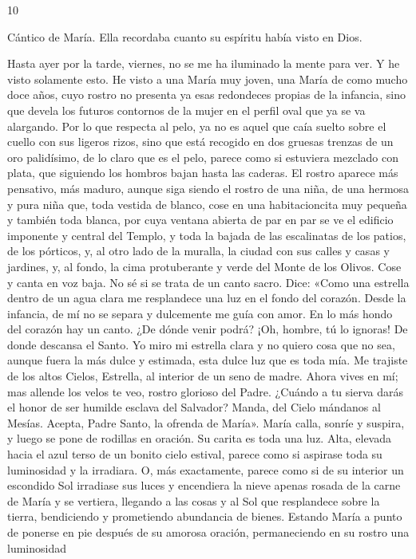\documentclass[12pt]{book} %
\begin{document}
10 
 
Cántico de María. Ella recordaba cuanto su espíritu había visto en Dios. 
 
Hasta ayer por la tarde, viernes, no se me ha iluminado la mente para ver. Y he visto solamente esto. He visto a una María muy joven, una María de como mucho doce años, cuyo rostro no presenta ya esas redondeces propias de la infancia, sino que devela los futuros contornos de la mujer en el perfil oval que ya se va alargando. Por lo  que respecta al pelo, ya no es aquel que caía suelto sobre el cuello con sus ligeros rizos, sino que está recogido en dos gruesas trenzas de un oro palidísimo, de lo claro que es el pelo, parece como si estuviera mezclado con plata, que siguiendo los hombros bajan hasta las caderas. El rostro aparece más pensativo, más maduro, aunque siga siendo el rostro de una niña, de una hermosa y pura niña que, toda vestida de blanco, cose en una habitacioncita muy pequeña y también toda blanca, por cuya ventana abierta de par en par se ve el edificio imponente y central del Templo, y toda la bajada de las escalinatas de los patios, de los pórticos, y, al otro lado de la muralla, la ciudad con sus calles y casas y jardines, y, al fondo, la cima protuberante y verde del Monte de los Olivos. 
Cose y canta en voz baja. No sé si se trata de un canto sacro. Dice: «Como una estrella dentro de un agua clara me resplandece una luz en el fondo del corazón. Desde la infancia, de mí no se separa y dulcemente me guía con amor. 
En lo más hondo del corazón hay un canto. 
¿De dónde venir podrá? 
¡Oh, hombre, tú lo ignoras! 
De donde descansa el Santo. Yo miro mi estrella clara y no quiero cosa que no sea, aunque fuera la más dulce y estimada, esta dulce luz que es toda mía. 
Me trajiste de los altos Cielos, 
Estrella, al interior de un seno de madre. Ahora vives en mí; mas allende los velos te veo, rostro glorioso del Padre. ¿Cuándo a tu sierva darás el honor de ser humilde esclava del Salvador? 
Manda, del Cielo mándanos al Mesías. 
Acepta, Padre Santo, la ofrenda de María». 
María calla, sonríe y suspira, y luego se pone de rodillas en oración. Su carita es toda una luz. Alta, elevada hacia el azul 
terso de un bonito cielo estival, parece como si aspirase toda su luminosidad y la irradiara. O, más exactamente, parece como si de su interior un escondido Sol irradiase sus luces y encendiera la nieve apenas rosada de la carne de María y se vertiera, llegando a las cosas y al Sol que resplandece sobre la tierra, bendiciendo y prometiendo abundancia de bienes. 
Estando María a punto de ponerse en pie después de su amorosa oración, permaneciendo en su rostro una luminosidad 
\end{document}
